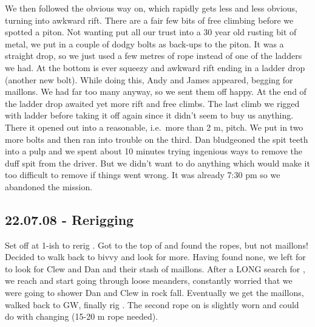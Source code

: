 We then followed the obvious way on, which rapidly gets less and less
obvious, turning into awkward rift. There are a fair few bits of free
climbing before we spotted a piton. Not wanting put all our trust into a
30 year old rusting bit of metal, we put in a couple of dodgy bolts as
back-ups to the piton. It was a straight drop, so we just used a few
metres of rope instead of one of the ladders we had. At the bottom is
ever squeezy and awkward rift ending in a ladder drop (another new
bolt). While doing this, Andy and James appeared, begging for maillons.
We had far too many anyway, so we sent them off happy. At the end of the
ladder drop awaited yet more rift and free climbs. The last climb we
rigged with ladder before taking it off again since it didn't seem to
buy us anything. There it opened out into a reasonable, i.e.~more than 2
m, pitch. We put in two more bolts and then ran into trouble on the
third. Dan bludgeoned the spit teeth into a pulp and we spent about 10
minutes trying ingenious ways to remove the duff spit from the driver.
But we didn't want to do anything which would make it too difficult to
remove if things went wrong. It was already 7:30 pm so we abandoned the
mission.


\subsection{22.07.08 - Rerigging \protect{}}


Set off at 1-ish to rerig . Got to the
top of  and found the ropes, but not maillons! Decided to
walk back to bivvy and look for more. Having found none, we left for
 to look for Clew and Dan and their stash of maillons. After a
LONG search for , we reach  and start going through loose meanders, constantly worried that we were going to shower Dan and Clew in
rock fall. Eventually we get the maillons, walked back to GW, finally
rig . The second rope on  is slightly worn and
could do with changing (15-20 m rope needed).


